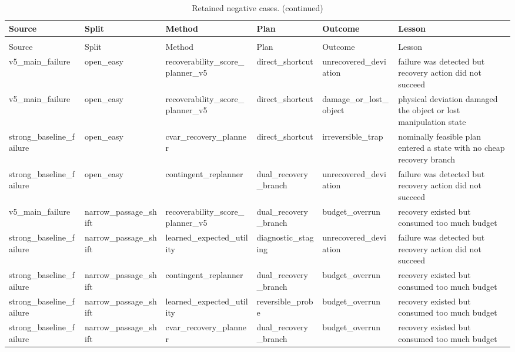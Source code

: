 \documentclass{article}
\begin{document}
\begin{center}
\scriptsize
\begin{longtable}{p{0.15\linewidth}p{0.16\linewidth}p{0.18\linewidth}p{0.13\linewidth}p{0.15\linewidth}p{0.23\linewidth}}
\caption{Retained negative cases.}\label{tab:negative-cases}\\
\toprule
Source & Split & Method & Plan & Outcome & Lesson\\
\midrule
\endfirsthead
\caption[]{Retained negative cases. (continued)}\\
\toprule
Source & Split & Method & Plan & Outcome & Lesson\\
\midrule
\endhead
v5\_main\_failure & open\_easy & recoverability\_score\_planner\_v5 & direct\_shortcut & unrecovered\_deviation & failure was detected but recovery action did not succeed\\
v5\_main\_failure & open\_easy & recoverability\_score\_planner\_v5 & direct\_shortcut & damage\_or\_lost\_object & physical deviation damaged the object or lost manipulation state\\
strong\_baseline\_failure & open\_easy & cvar\_recovery\_planner & direct\_shortcut & irreversible\_trap & nominally feasible plan entered a state with no cheap recovery branch\\
strong\_baseline\_failure & open\_easy & contingent\_replanner & dual\_recovery\_branch & unrecovered\_deviation & failure was detected but recovery action did not succeed\\
v5\_main\_failure & narrow\_passage\_shift & recoverability\_score\_planner\_v5 & dual\_recovery\_branch & budget\_overrun & recovery existed but consumed too much budget\\
strong\_baseline\_failure & narrow\_passage\_shift & learned\_expected\_utility & diagnostic\_staging & unrecovered\_deviation & failure was detected but recovery action did not succeed\\
strong\_baseline\_failure & narrow\_passage\_shift & contingent\_replanner & dual\_recovery\_branch & budget\_overrun & recovery existed but consumed too much budget\\
strong\_baseline\_failure & narrow\_passage\_shift & learned\_expected\_utility & reversible\_probe & budget\_overrun & recovery existed but consumed too much budget\\
strong\_baseline\_failure & narrow\_passage\_shift & cvar\_recovery\_planner & dual\_recovery\_branch & budget\_overrun & recovery existed but consumed too much budget\\

\end{longtable}
\end{center}
\end{document}

